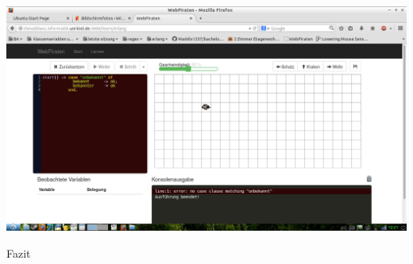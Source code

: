 \begin{frame}
\begin{center}
  \includegraphics[scale=0.2]{erlang/pics/caseerror.png}
\end{center}
\end{frame}

\begin{frame}
\begin{center}
\LARGE Fazit
\end{center}
\end{frame}
